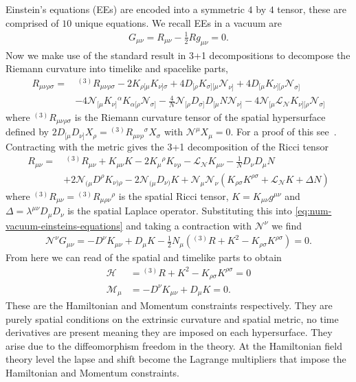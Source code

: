 \documentclass[10pt]{report}
\theoremstyle{definition}
\newcommand{\N}[0]{\mathcal{N}}
\begin{document}
Einstein's equations (EEs) are encoded into a symmetric $4$ by $4$ tensor, these are comprised of $10$ unique equations. We recall EEs in a vacuum are 
\begin{align}
    G_{\mu\nu} = R_{\mu\nu} - \frac{1}{2}R g_{\mu\nu} = 0. \label{eq:num-vacuum-einsteins-equations}
\end{align}
Now we make use of the standard result in 3+1 decompositions to decompose the Riemann curvature into timelike and spacelike parts, 
\begin{align}
    R_{\mu\nu\rho\sigma} = &\  {}^{(3)}R_{\mu\nu\rho\sigma} - 2 K_{\rho [\mu} K_{\nu]\sigma} + 4 D_{[\rho} K_{\sigma][\mu} \N_{\nu]} + 4 D_{[\mu} K_{\nu][\rho} \N_{\sigma]} \nonumber \\ & - 4 \N_{[\mu} K_{\nu]}{}^\alpha K_{\alpha[\rho} \N_{\sigma]} - \frac{4}{N} \N_{[\rho} D_{\sigma]} D_{[\mu} N \N_{\nu]} - 4 \N_{[\mu} \mathcal{L}_{\N} K_{\nu][\rho} \N_{\sigma]}
\end{align} 
where ${}^{(3)}R_{\mu\nu\rho\sigma}$ is the Riemann curvature tensor of the spatial hypersurface defined by $2 D_{[\mu} D_{\nu]} X_\rho = {}^{(3)} R_{\mu\nu\rho}{}^\sigma X_\sigma$ with $\N^\mu X_\mu = 0$. For a proof of this see~\cite{NumericalRelatBaumga2010}. Contracting with the metric gives the 3+1 decomposition of the Ricci tensor 
\begin{align}
    R_{\mu\nu} = &\ {}^{(3)}R_{\mu\nu} + K_{\mu\nu} K - 2K_\mu{}^\rho K_{\nu\rho} - \mathcal{L}_\N K_{\mu\nu} - \frac{1}{N} D_\nu D_\mu N  \nonumber \\ & + 2 \N_{(\mu} D^\rho K_{\nu)\rho} - 2 \N_{(\mu} D_{\nu)} K + \N_\mu \N_\nu \left( K_{\rho\sigma} K^{\rho\sigma} + \mathcal{L}_{\N} K + \Delta N \right)
\end{align}
where ${}^{(3)} R_{\mu\nu} = {}^{(3)}R_{\mu\rho\nu}{}^{\rho}$ is the spatial Ricci tensor, $K = K_{\mu\nu} g^{\mu\nu}$ and $\Delta = \lambda^{\mu\nu} D_\mu D_\nu$ is the spatial Laplace operator. Substituting this into \cref{eq:num-vacuum-einsteins-equations} and taking a contraction with $\N^\nu$ we find 
\begin{align}
    \N^\nu G_{\mu\nu} = - D^\nu K_{\mu\nu} + D_\mu K - \frac{1}{2} N_\mu \left( {}^{(3)} R + K^2 - K_{\rho\sigma} K^{\rho\sigma} \right) = 0.
\end{align}
From here we can read of the spatial and timelike parts to obtain 
\begin{align}
    \mathcal{H} &= {}^{(3)} R + K^2 - K_{\rho\sigma} K^{\rho\sigma} = 0 \\
    \mathcal{M}_\mu &= - D^\nu K_{\mu\nu} + D_\mu K = 0.
\end{align}
These are the Hamiltonian and Momentum constraints respectively. They are purely spatial conditions on the extrinsic curvature and spatial metric, no time derivatives are present meaning they are imposed on each hypersurface. They arise due to the diffeomorphism freedom in the theory. At the Hamiltonian field theory level the lapse and shift become the Lagrange multipliers that impose the Hamiltonian and Momentum constraints.
\end{document}
